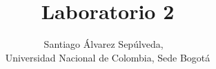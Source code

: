 \documentclass{IEEEtran}
\title{
	Laboratorio 2
}
\author{
    Santiago Álvarez Sepúlveda, ~\IEEEmembership{\url{saalvarezse@unal.edu.co}, Cód:~25481031}\\
    Universidad Nacional de Colombia, Sede Bogotá
}
\begin{document}
\maketitle

\IEEEpeerreviewmaketitle
\IEEEtitleabstractindextext
\IEEEpeerreviewmaketitle





\end{document}
